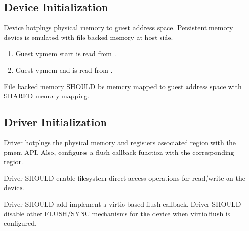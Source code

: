 \subsection{Device Initialization}\label{sec:Device Types / PMEM Device / Device Initialization}

Device hotplugs physical memory to guest address space. Persistent memory device
is emulated with file backed memory at host side.

\begin{enumerate}
\item Guest vpmem start is read from .
\item Guest vpmem end is read from .
\end{enumerate}


File backed memory SHOULD be memory mapped to guest address space with SHARED
memory mapping.

\subsection{Driver Initialization}\label{sec:Device Types / PMEM Driver / Driver Initialization}

Driver hotplugs the physical memory and registers associated
region with the pmem API. Also, configures a flush callback
function with the corresponding region.


Driver SHOULD enable filesystem direct access operations for
read/write on the device.


Driver SHOULD add implement a virtio based flush callback.
Driver SHOULD disable other FLUSH/SYNC mechanisms for the device
when virtio flush is configured.


